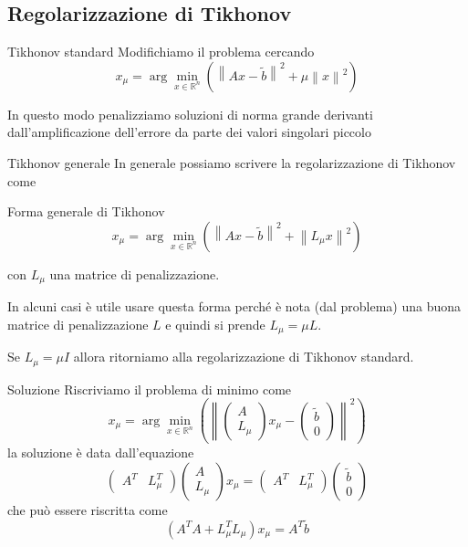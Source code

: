 \documentclass{beamer}
\theoremstyle{plain}
\theoremstyle{definition}
\theoremstyle{remark}
\newcommand{\pa}[1]{\left(#1\right)}
\newcommand{\norm}[1]{\left\|#1\right\|}
\begin{document}
\subsection{Regolarizzazione di Tikhonov}

\begin{frame}{Tikhonov standard}
  Modifichiamo il problema cercando
  \[ x_\mu = \arg\min _{x \in \mathbb{R}^n} \pa{ \norm{Ax -\tilde b}^2
    + \mu\norm{x}^2} \]
  \vfill
  
  In questo modo penalizziamo soluzioni di norma grande derivanti
  dall'amplificazione dell'errore da parte dei valori singolari piccolo
\end{frame}

\begin{frame}{Tikhonov generale}
  In generale possiamo scrivere la regolarizzazione di Tikhonov come
  \begin{block}{Forma generale di Tikhonov}
  \[ x_\mu = \arg\min _{x \in \mathbb{R}^n} \pa{ \norm{Ax -\tilde b}^2 +
    \norm{L_\mu x}^2} \]
  \end{block}
  con $L_\mu$ una matrice di penalizzazione.

  In alcuni casi è utile usare questa forma perché è nota (dal
  problema) una buona matrice di penalizzazione $L$ e quindi si prende
  $L_\mu = \mu L$.
  \vfill

  Se $L_\mu = \mu I$ allora ritorniamo alla regolarizzazione di
  Tikhonov standard.
\end{frame}

\begin{frame}{Soluzione}
  Riscriviamo il problema di minimo come
  \[ x_\mu = \arg\min _{x \in \mathbb{R}^n} \pa{ \norm{ 
      \begin{pmatrix}
        A \\
        L_\mu
      \end{pmatrix}
      x_\mu -
      \begin{pmatrix}
        \tilde b\\
        0
      \end{pmatrix}
      }^2 }\]
  la soluzione è data dall'equazione
  \[ \begin{pmatrix}
    A^T & L_\mu ^T
  \end{pmatrix}
  \begin{pmatrix}
    A \\
    L_\mu
  \end{pmatrix}
  x_\mu = 
  \begin{pmatrix}
    A^T & L_\mu ^T
  \end{pmatrix}
  \begin{pmatrix}
    \tilde b\\
    0
  \end{pmatrix} \]
  che può essere riscritta come
  \[ \pa{ A^T A + L_\mu^T L_\mu } x_\mu = A^T \tilde b  \]
\end{frame}
\end{document}
